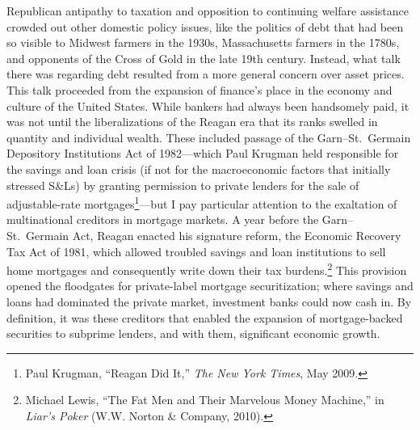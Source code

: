 \documentclass[12pt,oneside]{psthesis}
\begin{document}
Republican antipathy to taxation and opposition to continuing welfare assistance crowded out other domestic policy issues, like the politics of debt that had been so visible to Midwest farmers in the 1930s, Massachusetts farmers in the 1780s, and opponents of the Cross of Gold in the late 19th century.
Instead, what talk there was regarding debt resulted from a more general concern over asset prices.
This talk proceeded from the expansion of finance's place in the economy and culture of the United States.
While bankers had always been handsomely paid, it was not until the liberalizations of the Reagan era that its ranks swelled in quantity and individual wealth.
These included passage of the Garn--St.~Germain Depository Institutions Act of 1982---which Paul Krugman held responsible for the savings and loan crisis (if not for the macroeconomic factors that initially stressed S\&Ls) by granting permission to private lenders for the sale of adjustable-rate mortgages\footnote{Paul Krugman, ``Reagan Did It,'' \emph{The New York Times}, May 2009.}---but I pay particular attention to the exaltation of multinational creditors in mortgage markets.
A year before the Garn--St.~Germain Act, Reagan enacted his signature reform, the Economic Recovery Tax Act of 1981, which allowed troubled savings and loan institutions to sell home mortgages and consequently write down their tax burdens.\footnote{Michael Lewis, ``The Fat Men and Their Marvelous Money Machine,'' in \emph{Liar's Poker} (W.W. Norton \& Company, 2010).}
This provision opened the floodgates for private-label mortgage securitization; where savings and loans had dominated the private market, investment banks could now cash in.
By definition, it was these creditors that enabled the expansion of mortgage-backed securities to subprime lenders, and with them, significant economic growth.
\end{document}
